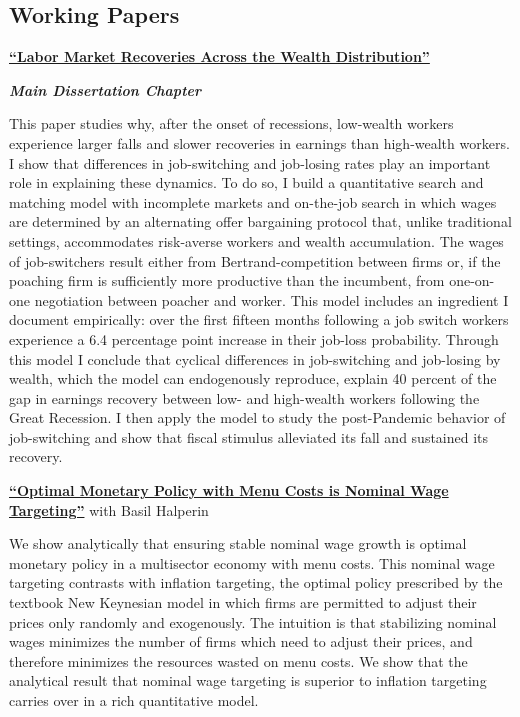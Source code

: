 \documentclass[margin,line]{res}                          %
\newenvironment{list1}{
	\begin{list}{\ding{113}}{%
			\setlength{\itemsep}{0in}
			\setlength{\parsep}{0in} \setlength{\parskip}{0in}
			\setlength{\topsep}{0in} \setlength{\partopsep}{0in}
			\setlength{\leftmargin}{0.17in}}}{\end{list}}
\begin{document}
\begin{resume}
	\section{\sc Working Papers}
	\begin{list1}
		\item[] \href{https://danicaratelli.github.io/research/papers/JMP_Caratelli.pdf}{\textbf{{\color{darkblue}``Labor Market Recoveries Across the Wealth Distribution''}}}\smallskip
		\item[] \emph{\textbf{Main Dissertation Chapter}}\smallskip
		\item[] This paper studies why, after the onset of recessions, low-wealth workers experience larger falls and slower recoveries in earnings than high-wealth workers. I show that differences in job-switching and job-losing rates play an important role in explaining these dynamics. To do so, I build a quantitative search and matching model with incomplete markets and on-the-job search in which wages are determined by an alternating offer bargaining protocol that, unlike traditional settings, accommodates risk-averse workers and wealth accumulation. The wages of job-switchers result either from Bertrand-competition between firms or, if the poaching firm is sufficiently more productive than the incumbent, from one-on-one negotiation between poacher and worker. This model includes an ingredient I document empirically: over the first fifteen months following a job switch workers experience a 6.4 percentage point increase in their job-loss probability. Through this model I conclude that cyclical differences in job-switching and job-losing by wealth, which the model can endogenously reproduce, explain 40 percent of the gap in earnings recovery between low- and high-wealth workers following the Great Recession. I then apply the model to study the post-Pandemic behavior of job-switching and show that fiscal stimulus alleviated its fall and sustained its recovery.
		
		\vspace{7pt}
		
		\item[] \href{https://danicaratelli.github.io/research/papers/OptimalMP_CaratelliHalperin.pdf}{\textbf{``Optimal Monetary Policy with Menu Costs is Nominal Wage Targeting''}} with Basil Halperin\smallskip
		\item[] We show analytically that ensuring stable nominal wage growth is optimal monetary policy in a multisector economy with menu costs. This nominal wage targeting contrasts with inflation targeting, the optimal policy prescribed by the textbook New Keynesian model in which firms are permitted to adjust their prices only randomly and exogenously. The intuition is that stabilizing nominal wages minimizes the number of firms which need to adjust their prices, and therefore minimizes the resources wasted on menu costs. We show that the analytical result that nominal wage targeting is superior to inflation targeting carries over in a rich quantitative model.
		\vspace{9pt}		
	\end{list1}
	

\end{resume}
\end{document}

